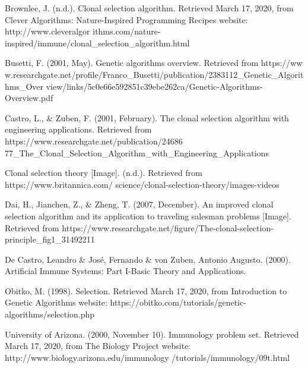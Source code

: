 \documentclass[]{interact}
\theoremstyle{plain} %
\theoremstyle{definition}
\theoremstyle{remark}
\begin{document}
\begin{thebibliography}{99}

Brownlee, J. (n.d.). Clonal selection algorithm. Retrieved March 17, 2020, from Clever Algorithms: Nature-Inspired Programming Recipes website: http://www.cleveralgor ithms.com/nature-inspired/immune/clonal\_selection\_algorithm.html 

Busetti, F. (2001, May). Genetic algorithms overview. Retrieved from https://ww w.researchgate.net/profile/Franco\_Busetti/publication/2383112\_Genetic\_Algorithms\_Over view/links/5c0e66e592851c39ebe262ca/Genetic-Algorithms-Overview.pdf

Castro, L., \& Zuben, F. (2001, February). The clonal selection algorithm with engineering applications. Retrieved from https://www.researchgate.net/publication/24686 77\_The\_Clonal\_Selection\_Algorithm\_with\_Engineering\_Applications 

Clonal selection theory [Image]. (n.d.). Retrieved from https://www.britannica.com/ science/clonal-selection-theory/images-videos

Dai, H., Jianchen, Z., \& Zheng, T. (2007, December). An improved clonal selection algorithm and its application to traveling salesman problems [Image]. Retrieved from https://www.researchgate.net/figure/The-clonal-selection-principle\_fig1\_31492211 

De Castro, Leandro \& José, Fernando \& von Zuben, Antonio Augusto. (2000). Artificial Immune Systems: Part I-Basic Theory and Applications. 

Obitko, M. (1998). Selection. Retrieved March 17, 2020, from Introduction to Genetic Algorithms website: https://obitko.com/tutorials/genetic-algorithms/selection.php

University of Arizona. (2000, November 10). Immunology problem set. Retrieved March 17, 2020, from The Biology Project website: http://www.biology.arizona.edu/immunology /tutorials/immunology/09t.html 

\end{thebibliography}
\end{document}

